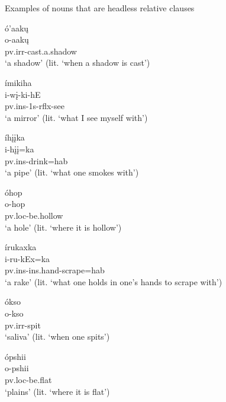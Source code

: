 \begin{exe}
    \item\label{Ch5HeadlessRCExs} Examples of nouns that are headless relative clauses

    \begin{xlist}
        \item\label{Ch5HeadlessRCExsA} \glll ó'aakų\\
        o-aakų\\
        pv.irr-\textnormal{cast.a.shadow}\\
        \glt `a shadow' (lit. `when a shadow is cast') \citep[57]{hollow1970}

        \item\label{Ch5HeadlessRCExsB} \glll ímikiha\\
        i-wį-ki-hE\\
        pv.ins-1s-rflx-\textnormal{see}\\
        \glt `a mirror' (lit. `what I see myself with') \citep[71]{hollow1970}

        \item\label{Ch5HeadlessRCExsC} \glll íhįįka\\
        i-hįį=ka\\
        pv.ins-\textnormal{drink}=hab\\
        \glt `a pipe' (lit. `what one smokes with') \citep[74]{hollow1970}

        \item\label{Ch5HeadlessRCExsD} \glll óhop\\
        o-hop\\
        pv.loc-\textnormal{be.hollow}\\
        \glt `a hole' (lit. `where it is hollow') \citep[77]{hollow1970}

        \item\label{Ch5HeadlessRCExsE} \glll írukaxka\\
        i-ru-kEx=ka\\
        pv.ins-ins.hand-\textnormal{scrape}=hab\\
        \glt `a rake' (lit. `what one holds in one's hands to scrape with') \citep[107]{hollow1970}

        \item\label{Ch5HeadlessRCExsF} \glll ókso\\
        o-kso\\
        pv.irr-\textnormal{spit}\\
        \glt `saliva' (lit. `when one spits') \citep[121]{hollow1970}

        \item\label{Ch5HeadlessRCExsG} \glll ópshii\\
        o-pshii\\
        pv.loc-\textnormal{be.flat}\\
        \glt `plains' (lit. `where it is flat') \citep[445]{hollow1970}
    \end{xlist}
\end{exe}

